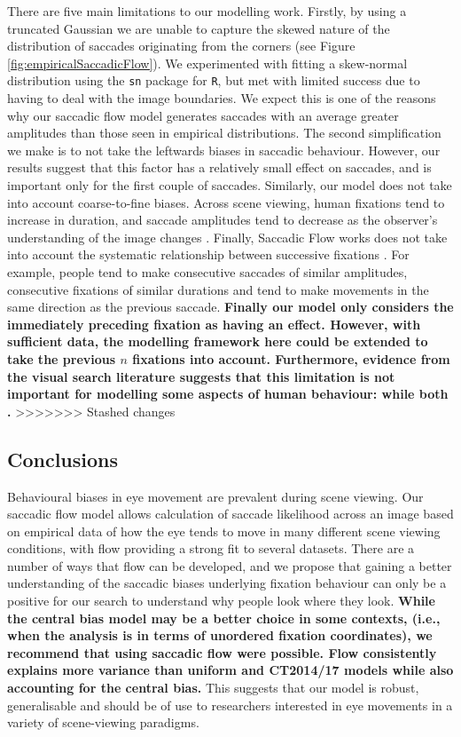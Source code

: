 \documentclass[a4paper, twocolumn, oneside, 11pt]{article}
\begin{document}
There are five main limitations to our modelling work. Firstly, by using a truncated Gaussian we are unable to capture the skewed nature of the distribution of saccades originating from the corners (see Figure  \ref{fig:empiricalSaccadicFlow}). We experimented with fitting a skew-normal distribution using the \texttt{sn} package for \texttt{R}, but met with limited success due to having to deal with the image boundaries. We expect this is one of the reasons why our saccadic flow model generates saccades with an average greater amplitudes than those seen in empirical distributions.  The second simplification we make is to not take the leftwards biases in saccadic behaviour. However, our results suggest that this factor has a relatively small effect on saccades, and is important only for the first couple of saccades. Similarly, our model does not take into account coarse-to-fine biases. Across scene viewing, human fixations tend to increase in duration, and saccade amplitudes tend to decrease as the observer's understanding of the image changes \citep{antes1974}. Finally, Saccadic Flow works does not take into account the systematic relationship between successive fixations \citep{tatler2008}. For example, people tend to make consecutive saccades of similar amplitudes, consecutive fixations of similar durations and tend to make movements in the same direction as the previous saccade. \textbf{Finally our model only considers the immediately preceding fixation as having an effect. However, with sufficient data, the modelling framework here could be extended to take the previous $n$ fixations into account. Furthermore, evidence from the visual search literature suggests that this limitation is not important for modelling some aspects of human behaviour:  while both \cite{clarke2016}.}
>>>>>>> Stashed changes


\subsection{Conclusions}
Behavioural biases in eye movement are prevalent during scene viewing. Our saccadic flow model allows calculation of saccade likelihood across an image based on empirical data of how the eye tends to move in many different scene viewing conditions, with flow providing a strong fit to several datasets. There are a number of ways that flow can be developed, and we propose that gaining a better understanding of the saccadic biases underlying fixation behaviour can only be a positive for our search to understand why people look where they look. \textbf{While the central bias model may be a better choice in some contexts, (i.e., when the analysis is in terms of unordered fixation coordinates), we recommend that using saccadic flow were possible. Flow consistently explains more variance than uniform and CT2014/17 models while also accounting for the central bias.} This suggests that our model is robust, generalisable and should be of use to researchers interested in eye movements in a variety of scene-viewing paradigms. 
\end{document}
